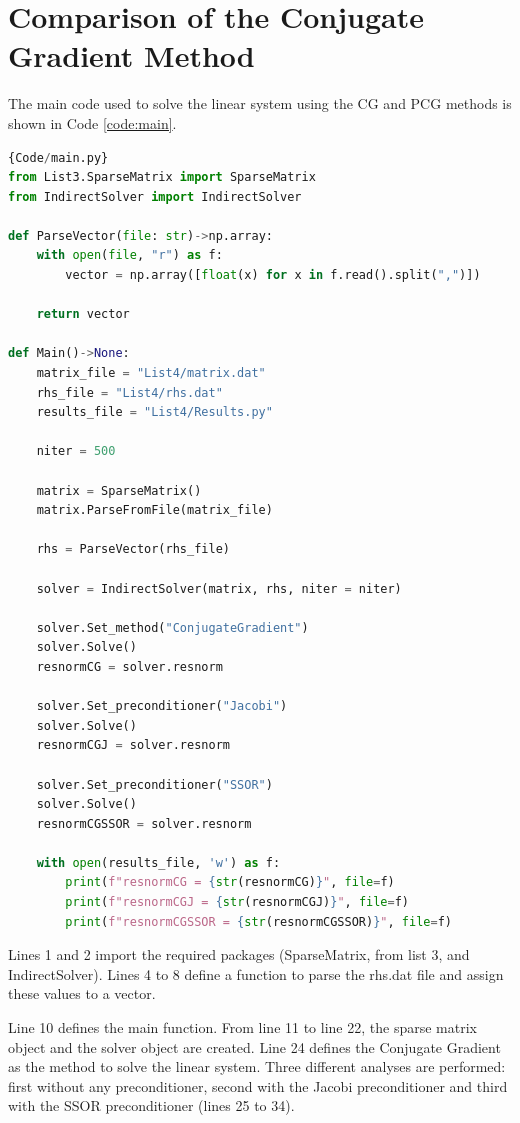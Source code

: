 \section{Comparison of the Conjugate Gradient Method}\label{sec:results}
The main code used to solve the linear system using the CG and PCG methods is shown in Code \ref{code:main}. 
\begin{lstlisting}[language=Python, caption={Main code to solve the linear system using the CG and PCG methods.}, label={code:main}]{Code/main.py}
from List3.SparseMatrix import SparseMatrix
from IndirectSolver import IndirectSolver

def ParseVector(file: str)->np.array:
    with open(file, "r") as f:
        vector = np.array([float(x) for x in f.read().split(",")])      
    
    return vector

def Main()->None:
    matrix_file = "List4/matrix.dat"
    rhs_file = "List4/rhs.dat"
    results_file = "List4/Results.py"

    niter = 500

    matrix = SparseMatrix()
    matrix.ParseFromFile(matrix_file)

    rhs = ParseVector(rhs_file)

    solver = IndirectSolver(matrix, rhs, niter = niter)

    solver.Set_method("ConjugateGradient")
    solver.Solve()
    resnormCG = solver.resnorm

    solver.Set_preconditioner("Jacobi")
    solver.Solve()
    resnormCGJ = solver.resnorm

    solver.Set_preconditioner("SSOR")
    solver.Solve()
    resnormCGSSOR = solver.resnorm

    with open(results_file, 'w') as f:
        print(f"resnormCG = {str(resnormCG)}", file=f)
        print(f"resnormCGJ = {str(resnormCGJ)}", file=f)
        print(f"resnormCGSSOR = {str(resnormCGSSOR)}", file=f)
\end{lstlisting}

Lines 1 and 2 import the required packages (SparseMatrix, from list 3, and IndirectSolver). Lines 4 to 8 define a function to parse the rhs.dat file and assign these values to a vector. 

Line 10 defines the main function. From line 11 to line 22, the sparse matrix object and the solver object are created. Line 24 defines the Conjugate Gradient as the method to solve the linear system. Three different analyses are performed: first without any preconditioner, second with the Jacobi preconditioner and third with the SSOR preconditioner (lines 25 to 34). 

